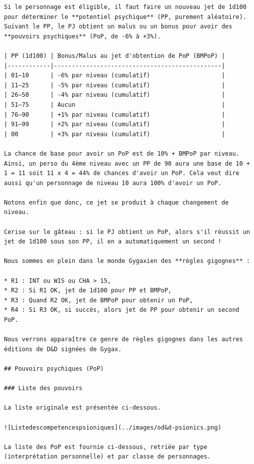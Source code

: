 \documentclass[11pt]{article}
\begin{document}
{\begin{verbatim}
Si le personnage est éligible, il faut faire un nouveau jet de 1d100 pour déterminer le **potentiel psychique** (PP, purement aléatoire). Suivant le PP, le PJ obtient un malus ou un bonus pour avoir des **pouvoirs psychiques** (PoP, de -6% à +3%).

| PP (1d100) | Bonus/Malus au jet d'obtention de PoP (BMPoP) |
|------------|-----------------------------------------------|
| 01–10      | -6% par niveau (cumulatif)                    |
| 11–25      | -5% par niveau (cumulatif)                    |
| 26–50      | -4% par niveau (cumulatif)                    |
| 51–75      | Aucun                                         |
| 76–90      | +1% par niveau (cumulatif)                    |
| 91–99      | +2% par niveau (cumulatif)                    |
| 00         | +3% par niveau (cumulatif)                    |

La chance de base pour avoir un PoP est de 10% + BMPoP par niveau. Ainsi, un perso du 4ème niveau avec un PP de 90 aura une base de 10 + 1 = 11 soit 11 x 4 = 44% de chances d'avoir un PoP. Cela veut dire aussi qu'un personnage de niveau 10 aura 100% d'avoir un PoP.

Notons enfin que donc, ce jet se produit à chaque changement de niveau.

Cerise sur le gâteau : si le PJ obtient un PoP, alors s'il réussit un jet de 1d100 sous son PP, il en a automatiquement un second !

Nous sommes en plein dans le monde Gygaxien des **règles gigognes** :

* R1 : INT ou WIS ou CHA > 15,
* R2 : Si R1 OK, jet de 1d100 pour PP et BMPoP,
* R3 : Quand R2 OK, jet de BMPoP pour obtenir un PoP,
* R4 : Si R3 OK, si succès, alors jet de PP pour obtenir un second PoP.

Nous verrons apparaître ce genre de règles gigognes dans les autres éditions de D&D signées de Gygax.

## Pouvoirs psychiques (PoP)

### Liste des pouvoirs

La liste originale est présentée ci-dessous.

![Listedescompetencespsioniques](../images/od&d-psionics.png)

La liste des PoP est fournie ci-dessous, retriée par type (interprétation personnelle) et par classe de personnages.


\end{verbatim}}
\end{document}
